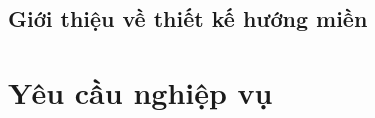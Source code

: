 \documentclass{article} %
\begin{document}
% 


% 

\subsection{Giới thiệu về thiết kế hướng miền}




\section{Yêu cầu nghiệp vụ}

% 




% 


% 


\end{document}
